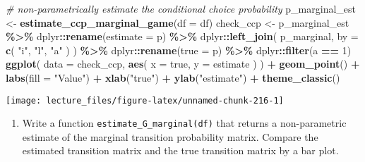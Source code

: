 \documentclass[
]{book}
\newenvironment{Shaded}{\begin{snugshade}}{\end{snugshade}}
\newcommand{\AttributeTok}[1]{\textcolor[rgb]{0.13,0.29,0.53}{#1}}
\newcommand{\CommentTok}[1]{\textcolor[rgb]{0.56,0.35,0.01}{\textit{#1}}}
\newcommand{\DecValTok}[1]{\textcolor[rgb]{0.00,0.00,0.81}{#1}}
\newcommand{\FunctionTok}[1]{\textcolor[rgb]{0.13,0.29,0.53}{\textbf{#1}}}
\newcommand{\NormalTok}[1]{#1}
\newcommand{\OtherTok}[1]{\textcolor[rgb]{0.56,0.35,0.01}{#1}}
\newcommand{\SpecialCharTok}[1]{\textcolor[rgb]{0.81,0.36,0.00}{\textbf{#1}}}
\newcommand{\StringTok}[1]{\textcolor[rgb]{0.31,0.60,0.02}{#1}}
\providecommand{\tightlist}{%
  \setlength{\itemsep}{0pt}\setlength{\parskip}{0pt}}
\begin{document}
\begin{Shaded}
\begin{Highlighting}[]
\CommentTok{\# non{-}parametrically estimate the conditional choice probability}
\NormalTok{p\_marginal\_est }\OtherTok{\textless{}{-}} 
  \FunctionTok{estimate\_ccp\_marginal\_game}\NormalTok{(}\AttributeTok{df =}\NormalTok{ df)}
\NormalTok{check\_ccp }\OtherTok{\textless{}{-}} 
\NormalTok{  p\_marginal\_est }\SpecialCharTok{\%\textgreater{}\%}
\NormalTok{  dplyr}\SpecialCharTok{::}\FunctionTok{rename}\NormalTok{(}\AttributeTok{estimate =}\NormalTok{ p) }\SpecialCharTok{\%\textgreater{}\%}
\NormalTok{  dplyr}\SpecialCharTok{::}\FunctionTok{left\_join}\NormalTok{(}
\NormalTok{    p\_marginal, }
    \AttributeTok{by =} \FunctionTok{c}\NormalTok{(}
           \StringTok{"i"}\NormalTok{,}
           \StringTok{"l"}\NormalTok{, }
           \StringTok{"a"}
\NormalTok{           )}
\NormalTok{    ) }\SpecialCharTok{\%\textgreater{}\%}
\NormalTok{  dplyr}\SpecialCharTok{::}\FunctionTok{rename}\NormalTok{(}\AttributeTok{true =}\NormalTok{ p) }\SpecialCharTok{\%\textgreater{}\%}
\NormalTok{  dplyr}\SpecialCharTok{::}\FunctionTok{filter}\NormalTok{(a }\SpecialCharTok{==} \DecValTok{1}\NormalTok{)}
\FunctionTok{ggplot}\NormalTok{(}
  \AttributeTok{data =}\NormalTok{ check\_ccp, }
  \FunctionTok{aes}\NormalTok{(}
    \AttributeTok{x =}\NormalTok{ true, }
    \AttributeTok{y =}\NormalTok{ estimate}
\NormalTok{    )}
\NormalTok{  ) }\SpecialCharTok{+}
  \FunctionTok{geom\_point}\NormalTok{() }\SpecialCharTok{+}
  \FunctionTok{labs}\NormalTok{(}\AttributeTok{fill =} \StringTok{"Value"}\NormalTok{) }\SpecialCharTok{+}
  \FunctionTok{xlab}\NormalTok{(}\StringTok{"true"}\NormalTok{) }\SpecialCharTok{+} 
  \FunctionTok{ylab}\NormalTok{(}\StringTok{"estimate"}\NormalTok{)  }\SpecialCharTok{+} 
  \FunctionTok{theme\_classic}\NormalTok{()}
\end{Highlighting}
\end{Shaded}

\begin{center}\texttt{[image: lecture\_files/figure-latex/unnamed-chunk-216-1]} \end{center}

\begin{enumerate}
\def\labelenumi{\arabic{enumi}.}
\setcounter{enumi}{14}
\tightlist
\item
  Write a function \texttt{estimate\_G\_marginal(df)} that returns a non-parametric estimate of the marginal transition probability matrix. Compare the estimated transition matrix and the true transition matrix by a bar plot.
\end{enumerate}
\end{document}
